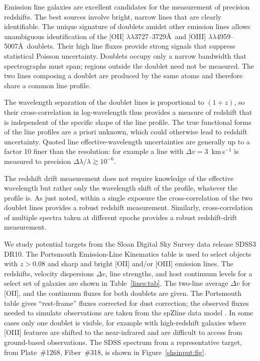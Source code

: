 \documentclass[preprint2, 10pt]{aastex}
\begin{document}
{Emission line galaxies are excellent candidates for the measurement of 
precision redshifts. The best sources involve bright, narrow lines that 
are clearly identifiable. 
The unique signature
of doublets amidst  other emission lines allows unambiguous identification of the [OII] $\lambda\lambda$3727--3729\AA\ 
and [OIII] $\lambda\lambda$4959--5007\AA\ doublets.
Their high line fluxes provide strong signals that suppress statistical Poisson uncertainty.
Doublets occupy only a narrow bandwidth that spectrographs must span; 
regions outside the doublet need not be measured. 
The two lines composing a doublet are produced by the same atoms and therefore
share a common line profile.

The wavelength separation of the doublet lines is proportional to $(1+z)$, 
so their cross-correlation in log-wavelength
thus provides a measure of redshift that is independent of the specific shape of the line profile.
The true functional forms of the line profiles are a priori unknown, which 
could otherwise lead to redshift uncertainty.  Quoted line effective-wavelength uncertainties
are generally up to a factor 10 finer than the resolution: for example a line with $\Delta v=3$~km\,s$^{-1}$ is measured to
precision $\Delta \lambda/\lambda \gtrsim 10^{-6}$.


The redshift drift measurement does not require knowledge of the effective wavelength but rather only the wavelength shift
of the profile, whatever the profile is. 
As just noted, within a single exposure the cross-correlation of the two doublet lines provides a robust redshift measurement.
Similarly, cross-correlation of multiple spectra taken at different epochs provides a robust redshift-drift measurement. 


We study potential targets from the Sloan Digital Sky Survey data release SDSS3 DR10.  The  Portsmouth Emission-Line Kinematics table \citep{2013MNRAS.431.1383T}  is used to select
objects 
with $z>0.08$
and sharp and bright [OII] and/or [OIII] emission lines.
The redshifts, velocity dispersions $\Delta v$, line strengths, and host continuum levels for a select set of galaxies are shown in Table~\ref{lines:tab}. 
The two-line average $\Delta v$ for [OII], and the continuum fluxes for both doublets  are given.
The Portsmouth table  gives ``rest-frame'' fluxes corrected for dust correction;
the observed fluxes needed to simulate observations are taken from the spZline data model
\citep{2012AJ....144..144B}.  In some cases only one doublet is visible, for example with high-redshift galaxies where [OIII] features are shifted to the near-infrared and are difficult to access from ground-based observations.
The SDSS spectrum from a representative 
target, from Plate~\#1268, Fiber~\#318, is shown in Figure~\ref{shsinput:fig}. 


}
\end{document}
